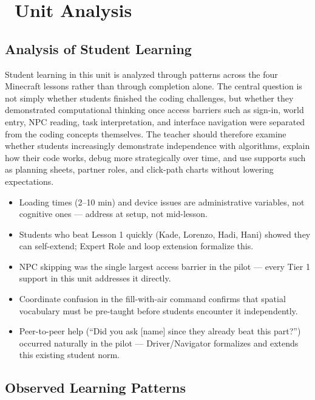 \documentclass[12pt]{article}
\begin{document}
\section{\texorpdfstring{\faLightbulb\ Unit Analysis}{Unit Analysis}}

\subsection{Analysis of Student Learning}

Student learning in this unit is analyzed through patterns across the four Minecraft lessons rather than through completion alone. The central question is not simply whether students finished the coding challenges, but whether they demonstrated computational thinking once access barriers such as sign-in, world entry, NPC reading, task interpretation, and interface navigation were separated from the coding concepts themselves. The teacher should therefore examine whether students increasingly demonstrate independence with algorithms, explain how their code works, debug more strategically over time, and use supports such as planning sheets, partner roles, and click-path charts without lowering expectations.

\begin{designbox}
\begin{itemize}
\item Loading times (2--10 min) and device issues are administrative variables, not cognitive ones --- address at setup, not mid-lesson.
\item Students who beat Lesson 1 quickly (Kade, Lorenzo, Hadi, Hani) showed they can self-extend; Expert Role and loop extension formalize this.
\item NPC skipping was the single largest access barrier in the pilot --- every Tier 1 support in this unit addresses it directly.
\item Coordinate confusion in the fill-with-air command confirms that spatial vocabulary must be pre-taught before students encounter it independently.
\item Peer-to-peer help (``Did you ask [name] since they already beat this part?'') occurred naturally in the pilot --- Driver/Navigator formalizes and extends this existing student norm.
\end{itemize}
\end{designbox}

\subsection{Observed Learning Patterns}
\end{document}

